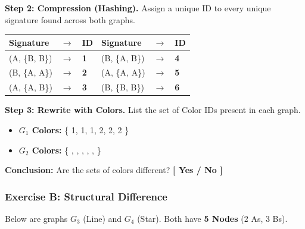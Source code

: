 \documentclass[a4paper, 12pt]{extarticle}
\begin{document}
\vspace{0.3cm}

\textbf{Step 2: Compression (Hashing).}
Assign a unique ID to every unique signature found across both graphs.

\begin{center}
\begin{tabular}{l c l | l c l}
    \toprule
    Signature & $\rightarrow$ & ID & Signature & $\rightarrow$ & ID \\
    \midrule
    (A, \{B, B\}) & $\rightarrow$ & \textbf{1} & (B, \{A, B\}) & $\rightarrow$ & \textbf{4} \\
    (B, \{A, A\}) & $\rightarrow$ & \textbf{2} & (A, \{A, A\}) & $\rightarrow$ & \textbf{5} \\
    (A, \{A, B\}) & $\rightarrow$ & \textbf{3} & (B, \{B, B\}) & $\rightarrow$ & \textbf{6} \\
    \bottomrule
\end{tabular}
\end{center}

\textbf{Step 3: Rewrite with Colors.}
List the set of Color IDs present in each graph.
\begin{itemize}
    \item \textbf{$G_1$ Colors:} \{ 1, 1, 1, 2, 2, 2 \}
    \item \textbf{$G_2$ Colors:} \{ \underline{\hspace{0.5cm}}, \underline{\hspace{0.5cm}}, \underline{\hspace{0.5cm}}, \underline{\hspace{0.5cm}}, \underline{\hspace{0.5cm}}, \underline{\hspace{0.5cm}} \}
\end{itemize}
\textbf{Conclusion:} Are the sets of colors different? \textbf{[ Yes / No ]}

\clearpage
\subsubsection*{Exercise B: Structural Difference}
Below are graphs $G_3$ (Line) and $G_4$ (Star). Both have \textbf{5 Nodes} (2 As, 3 Bs).
\end{document}

